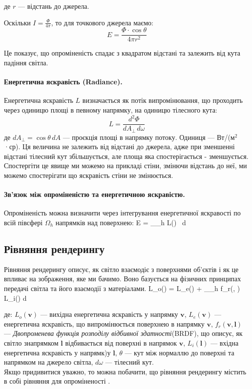 де $r$ — відстань до джерела.

Оскільки $I = \frac{\Phi}{4\pi}$, то для точкового джерела маємо:
\[
E = \frac{\Phi \cdot \cos{\theta}}{4\pi r^2}
\]

Це показує, що опроміненість спадає з квадратом відстані та залежить від кута падіння світла.

\paragraph{Енергетична яскравість (Radiance).}
Енергетична яскравість $L$ визначається як потік випромінювання, що проходить через одиницю площі в певному напрямку, на одиницю тілесного кута:
\[
L = \frac{d^2\Phi}{dA_{\perp} \, d\omega}
\]
де $dA_{\perp} = \cos{\theta} \, dA$ — проєкція площі в напрямку потоку. Одиниця — Вт/(м$^2$·ср).
Ця величина не залежить від відстані до джерела, адже при зменшенні відстані тілесний кут збільшується, але площа яка спостерігається - зменшується.
Спостергіти це явище ми можемо на прикладі стіни, змінючи відстань до неї, ми можемо спостерігати що яскравість стіни не змінюється.

\paragraph{Зв'язок між опроміненістю та енергетичною яскравістю.}
Опроміненість можна визначити через інтегрування енергетичної яскравості по всій півсфері $\Omega_h$ напрямків над поверхнею:
E = \int_{\Omega_h} L(\omega) \cos{\theta} \, d\omega
\eq

\subsection{Рівняння рендерингу}
Рівняння рендерингу описує, як світло взаємодіє з поверхнями об'єктів і як це впливає на зображення, яке ми бачимо. Воно базується на фізичних принципах 
передачі світла та його взаємодії з матеріалами.
  L_o() = L_e() + \int_{\Omega_h} f_r(, ) L_i() \cos{\theta} d\omega
\eq

де: $L_o(\mathbf{v})$ — вихідна енергетична яскравість у напрямку $\mathbf{v}$, $L_e(\mathbf{v})$ — енергетична яскравість, що випромінюється поверхнею в напрямку $\mathbf{v}$,
$f_r(\mathbf{v},\mathbf{l})$ — \textit{Двопроменева функція розподілу відбивної здатності}(BRDF), що описує, як світло знапрямком $\mathbf{l}$ відбивається від 
поверхні в напрямок $\mathbf{v}$, $L_i(\mathbf{l})$ — вхідна енергетична яскравість у напрямк)у $\mathbf{l}$, 
$\theta$ — кут між нормаллю до поверхні та напрямком на джерело світла, $d\omega$ — тілесний кут.\\
Якщо придивитися уважно, то можна побачити, що рівняння рендерингу містить в собі рівняння для опроміненості .
